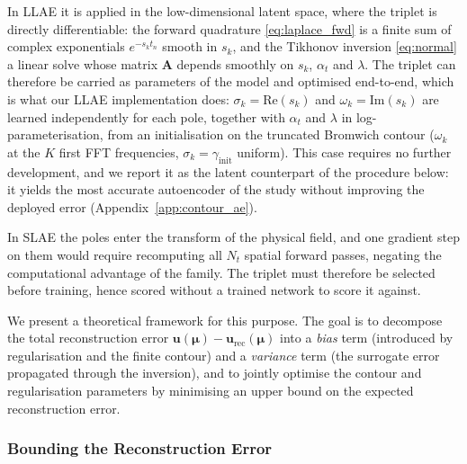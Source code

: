 ﻿\documentclass[a4paper,12pt]{article}
\theoremstyle{definition}
\theoremstyle{remark}
\newcommand{\vmu}{\bm{\mu}}
\begin{document}
In LLAE it is applied in the low-dimensional latent space, where the triplet is directly differentiable: the forward quadrature \eqref{eq:laplace_fwd} is a finite sum of complex exponentials $e^{-s_k t_n}$ smooth in $s_k$, and the Tikhonov inversion \eqref{eq:normal} a linear solve whose matrix $\bm{A}$ depends smoothly on $s_k$, $\alpha_t$ and $\lambda$. The triplet can therefore be carried as parameters of the model and optimised end-to-end, which is what our LLAE implementation does: $\sigma_k = \mathrm{Re}(s_k)$ and $\omega_k = \mathrm{Im}(s_k)$ are learned independently for each pole, together with $\alpha_t$ and $\lambda$ in log-parameterisation, from an initialisation on the truncated Bromwich contour ($\omega_k$ at the $K$ first FFT frequencies, $\sigma_k = \gamma_{\mathrm{init}}$ uniform). This case requires no further development, and we report it as the latent counterpart of the procedure below: it yields the most accurate autoencoder of the study without improving the deployed error (Appendix~\ref{app:contour_ae}).

In SLAE the poles enter the transform of the physical field, and one gradient step on them would require recomputing all $N_t$ spatial forward passes, negating the computational advantage of the family. The triplet must therefore be selected before training, hence scored without a trained network to score it against.

We present a theoretical framework for this purpose. The goal is to decompose the total reconstruction error $\bm{u}(\vmu) - \bm{u}_{\mathrm{rec}}(\vmu)$ into a \emph{bias} term (introduced by regularisation and the finite contour) and a \emph{variance} term (the surrogate error propagated through the inversion), and to jointly optimise the contour and regularisation parameters by minimising an upper bound on the expected reconstruction error.

\subsubsection{Bounding the Reconstruction Error}
\end{document}

